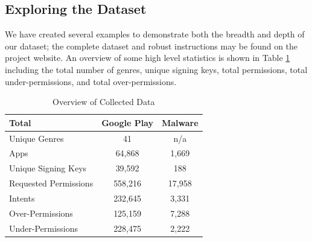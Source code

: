 \documentclass{sig-alternate-05-2015}
\newcommand{\todo}[1]{\textcolor{cyan}{\textbf{[#1]}}}
\begin{document}
\subsection{Exploring the Dataset}

We have created several examples to demonstrate both the breadth and depth of our dataset; the complete dataset and robust instructions may be found on the project website. An overview of some high level statistics is shown in Table \ref{Table:overallStats} including the total number of genres, unique signing keys, total permissions, total under-permissions, and total over-permissions.


\begin{table}[ht]
\begin{center}
\caption{Overview of Collected Data}
\label{Table:overallStats}
 \begin{tabular}{ | l | c | c |} \hline

	 \bfseries Total & \bfseries   Google Play & \bfseries Malware \\ \hline
	
	Unique Genres & 41 & n/a \\ \hline
	Apps &	64,868 & 1,669 \\ \hline
	Unique Signing Keys  & 39,592 & 188 \\ \hline

	Requested Permissions &	558,216 & 17,958 \\ \hline
	Intents &	232,645 & 3,331 \\ \hline
	Over-Permissions   & 125,159 & 7,288 \\ \hline
	Under-Permissions  & 228,475 & 2,222 \\ \hline
	
	
        	 	
  \end{tabular}
\end{center}
\end{table}





\end{document}
